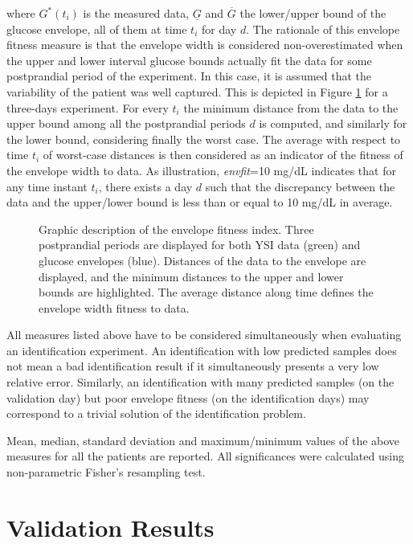 where $G^{\ast}(t_i)$ is the measured data, $\underline{G}$ and $\overline{G}$ the lower/upper bound of the glucose envelope, all of them at time $t_i$ for day $d$. The rationale of this envelope fitness measure is that the envelope width is considered non-overestimated when the upper and lower interval glucose bounds actually fit the data for some postprandial period of the experiment. In this case, it is assumed that the variability of the patient was well captured. This is depicted in Figure \ref{fig:overstimation} for a three-days experiment. For every $t_i$ the minimum distance from the data to the upper bound among all the postprandial periods $d$ is computed, and similarly for the lower bound, considering finally the worst case. The average with respect to time $t_i$ of worst-case distances is then considered as an indicator of the fitness of the envelope width to data. As illustration, \textit{env\textunderscore fit}=10 mg/dL indicates that for any time instant $t_i$, there exists a day $d$ such that the discrepancy between the data and the upper/lower bound is less than or equal to 10 mg/dL in average. 

\begin{figure}[hbtp]
\centering
{}\caption{Graphic description of the envelope fitness index. Three postprandial periods are displayed for both YSI data (green) and glucose envelopes (blue). Distances of the data to the envelope are displayed, and the minimum distances to the upper and lower bounds are highlighted. The average distance along time defines the envelope width fitness to data.}
\label{fig:overstimation}
\end{figure}

All measures listed above have to be considered simultaneously when evaluating an identification experiment. An identification with low predicted samples does not mean a bad identification result if it simultaneously presents a very low relative error. Similarly, an identification with many predicted samples (on the validation day) but poor envelope fitness (on the identification days) may correspond to a trivial solution of the identification problem.

Mean, median, standard deviation and maximum/minimum values of the above measures for all the patients are reported. All significances were calculated using non-parametric Fisher's resampling test.

\section{Validation Results}
\label{sec:IdentificationFromReferenceGlucose2}

